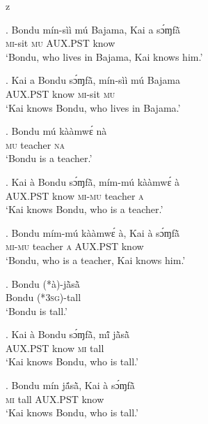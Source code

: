 z   \documentclass{assets/fieldnotes}
\begin{document}
\exg. Bondu mín-sìì mú Bajama, Kai a sɔ́ɱfã̀\\
{} \textsc{mi}-sit \textsc{mu} {} {} \textsc{AUX.PST} know\\
`Bondu, who lives in Bajama, Kai knows him.’

\exg. Kai a Bondu sɔ́ɱfã̀, mín-sìì mú Bajama\\
{} \textsc{AUX.PST} {} know \textsc{mi}-sit \textsc{mu} {}\\
`Kai knows Bondu, who lives in Bajama.’

\exg. Bondu mú kààmwɛ́ nà\\
{} \textsc{mu} teacher \textsc{na}\\
`Bondu is a teacher.’

\exg. Kai à Bondu sɔ́ɱfã̀, mím-mú kààmwɛ́ à\\
{} \textsc{AUX.PST} {} know \textsc{mi-mu} teacher \textsc{a}\\
`Kai knows Bondu, who is a teacher.’

\exg. Bondu mím-mú kààmwɛ́ à, Kai à sɔ́ɱfã̀\\
{} \textsc{mi-mu} teacher \textsc{a} {} \textsc{AUX.PST} know\\
`Bondu, who is a teacher, Kai knows him.’

\exg. Bondu (*à)-jã̀sã̀\\
Bondu (*\textsc{3sg})-tall\\
`Bondu is tall.’



\exg. Kai à Bondu sɔ́ɱfã̀, mĩ́ jã̀sã̀\\
{} \textsc{AUX.PST} {} know \textsc{mi} tall\\
`Kai knows Bondu, who is tall.’

\exg. Bondu mín jã́sã̀, Kai à sɔ́ɱfã̀\\
{} \textsc{mi} tall \textsc{AUX.PST} {} know\\
`Kai knows Bondu, who is tall.’


\end{document}
